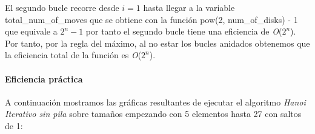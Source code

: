 \documentclass[a4paper,12pt]{article} %
\begin{document}
El segundo bucle recorre desde $i=1$ hasta llegar a la variable total\_num\_of\_moves que se obtiene con la función
pow(2, num\_of\_disks) - 1 que equivale a $2^n - 1$ por tanto el segundo bucle tiene una eficiencia de \textit{O}($2^n$).\\

Por tanto, por la regla del máximo, al no estar los bucles anidados obtenemos que la eficiencia total de la función es \textit{O}($2^n$).\\

\paragraph{Eficiencia práctica}

A continuación mostramos las gráficas resultantes de ejecutar el algoritmo \textit{Hanoi Iterativo sin pila}
sobre tamaños empezando con 5 elementos hasta 27 con saltos de 1:
\end{document}
